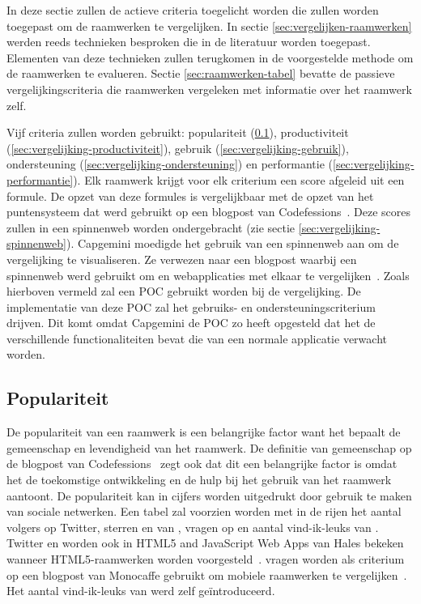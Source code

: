 In deze sectie zullen de actieve criteria toegelicht worden die zullen worden toegepast om de raamwerken te vergelijken.
In sectie \ref{sec:vergelijken-raamwerken} werden reeds technieken besproken die in de literatuur worden toegepast.
Elementen van deze technieken zullen terugkomen in de voorgestelde methode om de raamwerken te evalueren.
Sectie \ref{sec:raamwerken-tabel} bevatte de passieve vergelijkingscriteria die raamwerken vergeleken met informatie over het raamwerk zelf.

Vijf criteria zullen worden gebruikt: populariteit (\ref{sec:vergelijking-populariteit}), productiviteit (\ref{sec:vergelijking-productiviteit}), gebruik (\ref{sec:vergelijking-gebruik}), ondersteuning (\ref{sec:vergelijking-ondersteuning}) en performantie (\ref{sec:vergelijking-performantie}). 
Elk raamwerk krijgt voor elk criterium een score afgeleid uit een formule. 
De opzet van deze formules is vergelijkbaar met de opzet van het puntensysteem dat werd gebruikt op een blogpost van Codefessions~\cite{Sarrafi2012a}. 
Deze scores zullen in een spinnenweb worden ondergebracht (zie sectie \ref{sec:vergelijking-spinnenweb}).
Capgemini moedigde het gebruik van een spinnenweb aan om de vergelijking te visualiseren.
Ze verwezen naar een blogpost waarbij een spinnenweb werd gebruikt om  en webapplicaties met elkaar te vergelijken~\cite{Jeroen2012}.
Zoals hierboven vermeld zal een POC gebruikt worden bij de vergelijking.
De implementatie van deze POC zal het gebruiks- en ondersteuningscriterium drijven.  
Dit komt omdat Capgemini de POC zo heeft opgesteld dat het de verschillende functionaliteiten bevat die van een normale applicatie verwacht worden.


\subsection{Populariteit}
\label{sec:vergelijking-populariteit}
De populariteit van een raamwerk is een belangrijke factor want het bepaalt de gemeenschap en levendigheid van het raamwerk.
De definitie van gemeenschap op de blogpost van Codefessions~\cite{Sarrafi2012a} zegt ook dat dit een belangrijke factor is omdat het de toekomstige ontwikkeling en de hulp bij het gebruik van het raamwerk aantoont. 
De populariteit kan in cijfers worden uitgedrukt door gebruik te maken van sociale netwerken. 
Een tabel zal voorzien worden met in de rijen het aantal volgers op Twitter, sterren en  van \gh{},  vragen op \so{} en aantal vind-ik-leuks van \fb{}.
Twitter en \gh{} worden ook in HTML5 and JavaScript Web Apps van Hales bekeken wanneer HTML5-raamwerken worden voorgesteld~\cite{Hales2012}.
\so{} vragen worden als criterium op een blogpost van Monocaffe gebruikt om mobiele raamwerken te vergelijken~\cite{Ayuso2012}.  
Het aantal vind-ik-leuks van \fb{} werd zelf geïntroduceerd.

